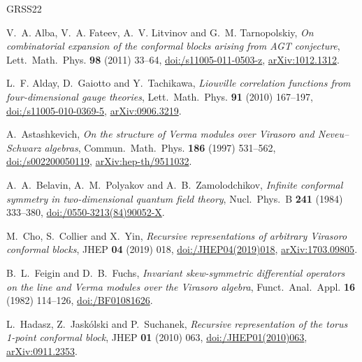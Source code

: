 \documentclass[twoside,10pt]{article}
\numberwithin{equation}{section}
\theoremstyle{slbody}
\theoremstyle{definition}
\theoremstyle{remark}
\begin{document}
{\small
\begin{thebibliography}{GRSS22}
\setlength{\itemsep}{0pt plus 0.5pt}
\setlength{\parskip}{0pt}

V.~A. Alba, V.~A. Fateev, A.~V. Litvinov and G.~M. Tarnopolskiy,
\emph{On combinatorial expansion of the conformal blocks arising from AGT
conjecture},
Lett.\ Math.\ Phys. \textbf{98} (2011) 33--64,
\href{https://doi.org/10.1007/s11005-011-0503-z}%
{doi:/s11005-011-0503-z},
\href{https://arxiv.org/abs/1012.1312}{arXiv:1012.1312}.

L.~F. Alday, D.~Gaiotto and Y.~Tachikawa,
\emph{Liouville correlation functions from four-dimensional gauge theories},
Lett.\ Math.\ Phys. \textbf{91} (2010) 167--197,
\href{https://doi.org/10.1007/s11005-010-0369-5}%
{doi:/s11005-010-0369-5},
\href{https://arxiv.org/abs/0906.3219}{arXiv:0906.3219}.

A.~Astashkevich,
\emph{On the structure of Verma modules over Virasoro and
Neveu--Schwarz algebras},
Commun.\ Math.\ Phys. \textbf{186} (1997) 531--562,
\href{https://doi.org/10.1007/s002200050119}%
{doi:/s002200050119},
\href{https://arxiv.org/abs/hep-th/9511032}{arXiv:hep-th/9511032}.

A.~A.~Belavin, A.~M.~Polyakov and A.~B.~Zamolodchikov,
\emph{Infinite conformal symmetry in two-dimensional quantum field theory},
Nucl.\ Phys.\ B \textbf{241} (1984) 333--380,
\href{https://doi.org/10.1016/0550-3213(84)90052-X}{doi:/0550-3213(84)90052-X}.

M.~Cho, S.~Collier and X.~Yin,
\emph{Recursive representations of arbitrary Virasoro conformal
blocks},
JHEP \textbf{04} (2019) 018,
\href{https://doi.org/10.1007/JHEP04(2019)018}%
{doi:/JHEP04(2019)018},
\href{https://arxiv.org/abs/1703.09805}{arXiv:1703.09805}.

B.~L.~Feigin and D.~B.~Fuchs,
\emph{Invariant skew-symmetric differential operators on the line and
Verma modules over the Virasoro algebra},
Funct.\ Anal.\ Appl. \textbf{16} (1982) 114--126,
\href{https://doi.org/10.1007/BF01081626}{doi:/BF01081626}.

L.~Hadasz, Z.~Jask\'olski and P.~Suchanek,
\emph{Recursive representation of the torus 1-point conformal block},
JHEP \textbf{01} (2010) 063,
\href{https://doi.org/10.1007/JHEP01(2010)063}%
{doi:/JHEP01(2010)063},
\href{https://arxiv.org/abs/0911.2353}{arXiv:0911.2353}.


\end{thebibliography}}
\end{document}
